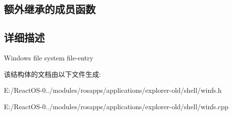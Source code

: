 \subsection*{额外继承的成员函数}


\subsection{详细描述}
Windows file system file-\/entry 

该结构体的文档由以下文件生成\+:\begin{DoxyCompactItemize}
\item 
E\+:/\+React\+O\+S-\/0../modules/rosapps/applications/explorer-\/old/shell/winfs.\+h\item 
E\+:/\+React\+O\+S-\/0../modules/rosapps/applications/explorer-\/old/shell/winfs.\+cpp\end{DoxyCompactItemize}
